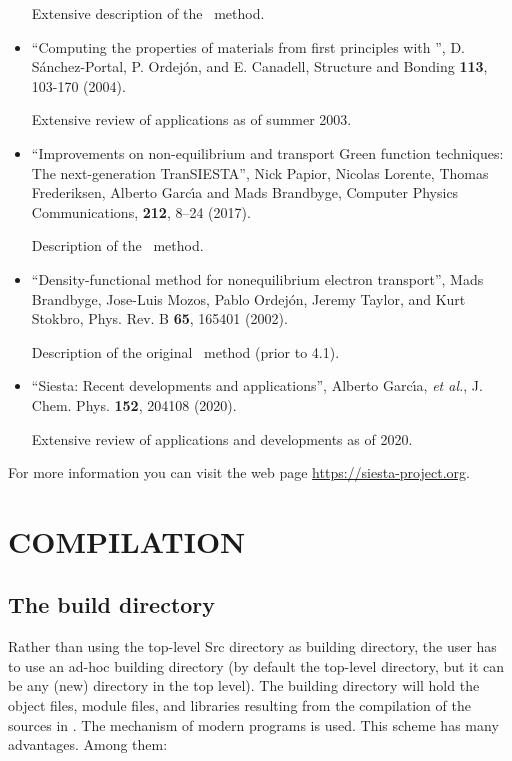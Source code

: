 \begin{itemize}
Extensive description of the \siesta\ method.

\item
``Computing the properties of materials from first principles
with  \siesta'', D. S\'anchez-Portal, P. Ordej\'on,
and E. Canadell, Structure and Bonding \textbf{113},
103-170 (2004).

Extensive review of applications as of summer 2003.

\item
 ``Improvements on non-equilibrium and transport Green function techniques: The next-generation TranSIESTA'',
 Nick Papior, Nicolas Lorente, Thomas Frederiksen, Alberto Garc\'{\i}a and
 Mads Brandbyge, Computer Physics Communications, \textbf{212}, 8--24 (2017).

 Description of the \tsiesta\ method.

\item
 ``Density-functional method for nonequilibrium electron transport'',
 Mads Brandbyge, Jose-Luis Mozos, Pablo Ordej\'on, Jeremy Taylor,
 and Kurt Stokbro, Phys. Rev. B \textbf{65}, 165401 (2002).

 Description of the original \tsiesta\ method (prior to 4.1).

 \item
 ``Siesta: Recent developments and applications'',
 Alberto Garc\'{\i}a, \emph{et al.}, J. Chem. Phys. \textbf{152}, 204108
 (2020).

 Extensive review of applications and developments as of 2020.

\end{itemize}

For more information you can visit the web page
\url{https://siesta-project.org}.

\section{COMPILATION}
\label{sec:compilation}

\subsection{The build directory}

Rather than using the top-level Src directory as building directory,
the user has to use an ad-hoc building directory (by default the
top-level  directory, but it can be any (new) directory in
the top level).  The building directory will hold the object files,
module files, and libraries resulting from the compilation of the
sources in .  The  mechanism of modern 
programs is used. This scheme has many advantages. Among them:

